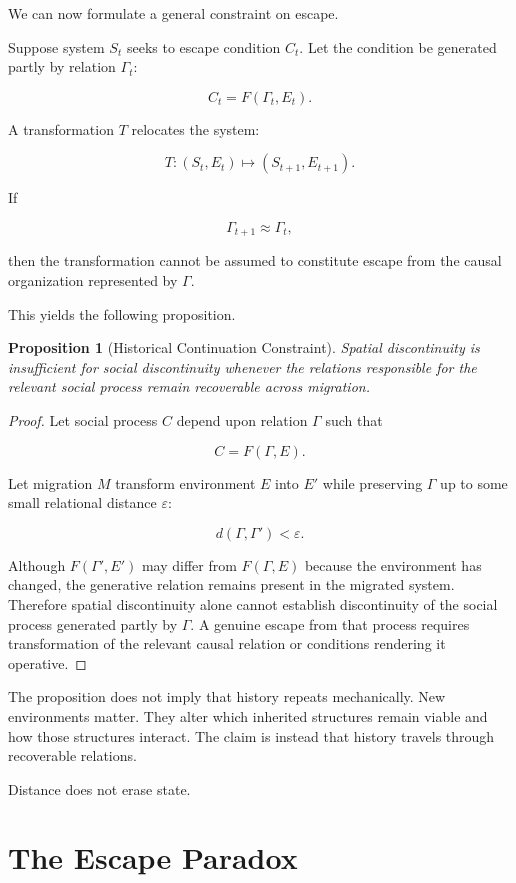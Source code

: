\documentclass[11pt,oneside]{book}
\newtheorem{proposition}[theorem]{Proposition}
\theoremstyle{definition}
\theoremstyle{remark}
\begin{document}
We can now formulate a general constraint on escape.

Suppose system \(S_t\) seeks to escape condition \(C_t\). Let the condition be generated partly by relation \(\Gamma_t\):

\[
C_t=F(\Gamma_t,E_t).
\]

A transformation \(T\) relocates the system:

\[
T:(S_t,E_t)\mapsto(S_{t+1},E_{t+1}).
\]

If

\[
\Gamma_{t+1}\approx\Gamma_t,
\]

then the transformation cannot be assumed to constitute escape from the causal organization represented by \(\Gamma\).

This yields the following proposition.

\begin{proposition}[Historical Continuation Constraint]
Spatial discontinuity is insufficient for social discontinuity whenever the relations responsible for the relevant social process remain recoverable across migration.
\end{proposition}

\begin{proof}
Let social process \(C\) depend upon relation \(\Gamma\) such that

\[
C=F(\Gamma,E).
\]

Let migration \(M\) transform environment \(E\) into \(E'\) while preserving \(\Gamma\) up to some small relational distance \(\varepsilon\):

\[
d(\Gamma,\Gamma')<\varepsilon.
\]

Although \(F(\Gamma',E')\) may differ from \(F(\Gamma,E)\) because the environment has changed, the generative relation remains present in the migrated system. Therefore spatial discontinuity alone cannot establish discontinuity of the social process generated partly by \(\Gamma\). A genuine escape from that process requires transformation of the relevant causal relation or conditions rendering it operative.
\end{proof}

The proposition does not imply that history repeats mechanically. New environments matter. They alter which inherited structures remain viable and how those structures interact. The claim is instead that history travels through recoverable relations.

Distance does not erase state.

\section{The Escape Paradox}
\end{document}
